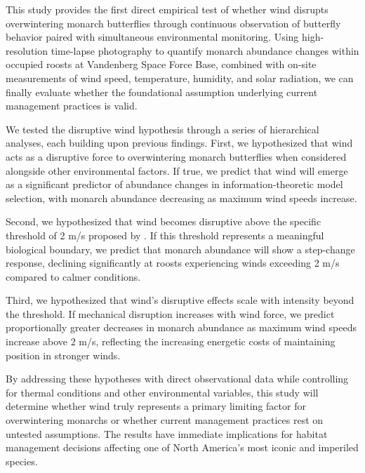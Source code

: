 This study provides the first direct empirical test of whether wind disrupts overwintering monarch butterflies through continuous observation of butterfly behavior paired with simultaneous environmental monitoring. Using high-resolution time-lapse photography to quantify monarch abundance changes within occupied roosts at Vandenberg Space Force Base, combined with on-site measurements of wind speed, temperature, humidity, and solar radiation, we can finally evaluate whether the foundational assumption underlying current management practices is valid.

We tested the disruptive wind hypothesis through a series of hierarchical analyses, each building upon previous findings. First, we hypothesized that wind acts as a disruptive force to overwintering monarch butterflies when considered alongside other environmental factors. If true, we predict that wind will emerge as a significant predictor of abundance changes in information-theoretic model selection, with monarch abundance decreasing as maximum wind speeds increase.

Second, we hypothesized that wind becomes disruptive above the specific threshold of 2 m/s proposed by \citet{leongEvaluationManagementCalifornia2016}. If this threshold represents a meaningful biological boundary, we predict that monarch abundance will show a step-change response, declining significantly at roosts experiencing winds exceeding 2 m/s compared to calmer conditions.

Third, we hypothesized that wind's disruptive effects scale with intensity beyond the threshold. If mechanical disruption increases with wind force, we predict proportionally greater decreases in monarch abundance as maximum wind speeds increase above 2 m/s, reflecting the increasing energetic costs of maintaining position in stronger winds.

By addressing these hypotheses with direct observational data while controlling for thermal conditions and other environmental variables, this study will determine whether wind truly represents a primary limiting factor for overwintering monarchs or whether current management practices rest on untested assumptions. The results have immediate implications for habitat management decisions affecting one of North America's most iconic and imperiled species.